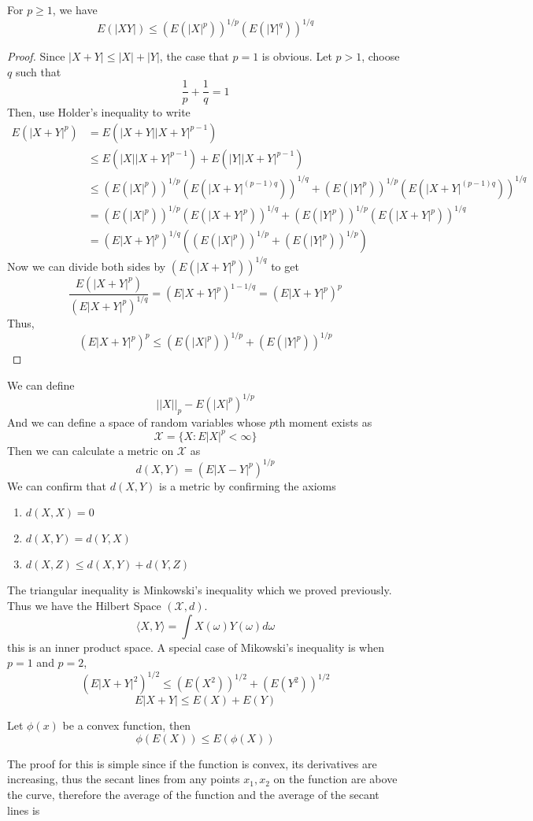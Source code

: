 \begin{theorem}
    For $p\geq 1$, we have 
    \[E(|XY|) \leq (E(|X|^p))^{1/p}(E(|Y|^q))^{1/q}\]
\end{theorem}
\begin{proof}
    Since $|X + Y| \leq |X| + |Y|$, the case that $p=1$ is obvious. Let $p > 1$, choose $q$ such that 
    \[\frac{1}{p} + \frac{1}{q} = 1\]
    Then, use Holder's inequality to write
    \begin{align*}
        E(|X + Y|^p) &= E(|X+Y||X+Y|^{p-1})\\
        &\leq E(|X||X+Y|^{p-1}) + E(|Y||X+Y|^{p-1})\\
        &\leq (E(|X|^p))^{1/p}(E(|X+Y|^{(p-1)q}))^{1/q} + (E(|Y|^p))^{1/p}(E(|X+Y|^{(p-1)q}))^{1/q}\\
        &= (E(|X|^p))^{1/p}(E(|X+Y|^{p}))^{1/q} + (E(|Y|^p))^{1/p}(E(|X+Y|^{p}))^{1/q}\\
        &= (E|X+Y|^p)^{1/q}((E(|X|^p))^{1/p} + (E(|Y|^p))^{1/p})
    \end{align*}
    Now we can divide both sides by $(E(|X+Y|^p))^{1/q}$ to get
    \[\frac{E(|X+Y|^p)}{(E|X+Y|^p)^{1/q}} = (E|X+Y|^p)^{1 - 1/q} = (E|X+Y|^p)^{p}\]
    Thus, 
    \[ (E|X+Y|^p)^{p} \leq (E(|X|^p))^{1/p} + (E(|Y|^p))^{1/p}\]
\end{proof}
We can define 
\[||X||_p - E(|X|^p)^{1/p}\]
And we can define a space of random variables whose $p$th moment exists as 
\[\mathcal{X} = \{X: E|X|^p < \infty\}\]
Then we can calculate a metric on $\mathcal{X}$ as 
\[d(X,Y) = (E|X-Y|^p)^{1/p}\]
We can confirm that $d(X,Y)$ is a metric by confirming the axioms 
\begin{enumerate}[label=(\roman*)]
    \item $d(X,X) = 0$
    \item $d(X,Y) = d(Y,X)$
    \item $d(X,Z) \leq d(X,Y) + d(Y,Z)$
\end{enumerate}
The triangular inequality is Minkowski's inequality which we proved previously. Thus we have the Hilbert Space $(\mathcal{X}, d)$. 
\[\langle X,Y\rangle = \int X(\omega)Y(\omega)d\omega\]
this is an inner product space. A special case of Mikowski's inequality is when $p=1$ and $p=2$, 
\[(E|X+Y|^2)^{1/2} \leq (E(X^2))^{1/2} + (E(Y^2))^{1/2}\]
\[E|X+Y| \leq E(X) + E(Y)\]
\begin{theorem}
    Let $\phi(x)$ be a convex function, then 
    \[\phi(E(X)) \leq E(\phi(X))\]
\end{theorem}
The proof for this is simple since if the function is convex, its derivatives are increasing, thus the secant lines from any points $x_1,x_2$ on the function are above the curve, therefore the average of the function and the average of the secant lines is 
